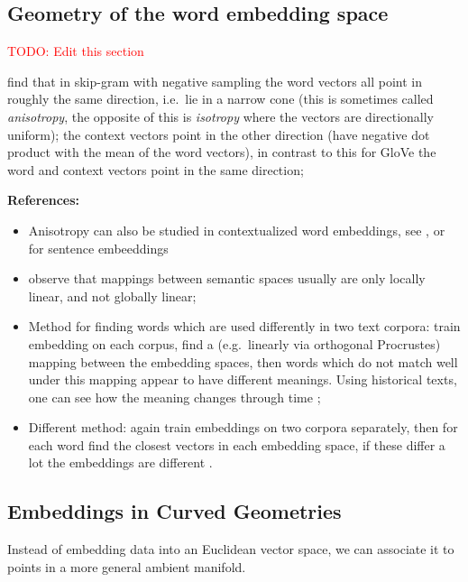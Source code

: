 \documentclass[11pt, a4paper]{amsart}
\begin{document}
\subsection{Geometry of the word embedding space}

\textcolor{red}{TODO: Edit this section}

\cite{mimno-thompson-2017-strange} find that in skip-gram with negative sampling the word vectors all point in roughly the same direction, i.e.\ lie in a narrow cone (this is sometimes called \emph{anisotropy}, the opposite of this is \emph{isotropy} where the vectors are directionally uniform);
the context vectors point in the other direction (have negative dot product with the mean of the word vectors),
in contrast to this for GloVe the word and context vectors point in the same direction;


\noindent \textbf{References:}
\begin{itemize}
	\item Anisotropy can also be studied in contextualized word embeddings, see \cite{ethayarajh-2019-contextual}, or for sentence embeeddings \cite{li-etal-2020-sentence}
	\item \cite{nakashole-flauger-2018-characterizing} observe that mappings between semantic spaces usually are only locally linear, and not globally linear;
	\item Method for finding words which are used differently in two text corpora:
	train embedding on each corpus, find a (e.g.\ linearly via orthogonal Procrustes) mapping between the embedding spaces, then words which do not match well under this mapping appear to have different meanings.
	Using historical texts, one can see how the meaning changes through time \cite{hamilton-etal-2016-diachronic};
	\item Different method:
	again train embeddings on two corpora separately, then for each word find the closest vectors in each embedding space, if these differ a lot the embeddings are different \cite{gonen-etal-2020-simple}.
\end{itemize}


\subsection{Embeddings in Curved Geometries}

 Instead of embedding data into an Euclidean vector space, we can associate it to points in a more general ambient manifold.
\end{document}
